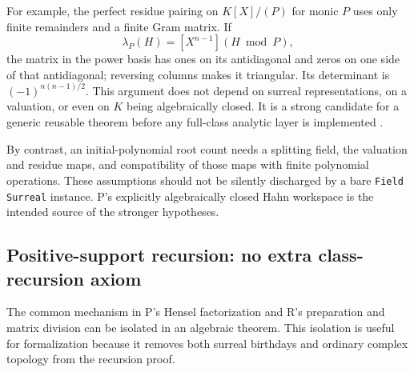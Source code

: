 \documentclass[11pt,letterpaper]{article}
\numberwithin{equation}{section}
\theoremstyle{definition}
\theoremstyle{remark}
\begin{document}
For example, the perfect residue pairing on $K[X]/(P)$ for monic $P$ uses only finite remainders and a finite Gram matrix. If
\[
\lambda_P(H)=[X^{n-1}](H\bmod P),
\]
the matrix in the power basis has ones on its antidiagonal and zeros on one side of that antidiagonal; reversing columns makes it triangular. Its determinant is $(-1)^{n(n-1)/2}$. This argument does not depend on surreal representations, on a valuation, or even on $K$ being algebraically closed. It is a strong candidate for a generic reusable theorem before any full-class analytic layer is implemented \cite{SourceP,SourceR}.

By contrast, an initial-polynomial root count needs a splitting field, the valuation and residue maps, and compatibility of those maps with finite polynomial operations. These assumptions should not be silently discharged by a bare \texttt{Field Surreal} instance. P's explicitly algebraically closed Hahn workspace is the intended source of the stronger hypotheses.

\subsection{Positive-support recursion: no extra class-recursion axiom}
The common mechanism in P's Hensel factorization and R's preparation and matrix division can be isolated in an algebraic theorem. This isolation is useful for formalization because it removes both surreal birthdays and ordinary complex topology from the recursion proof.
\end{document}
